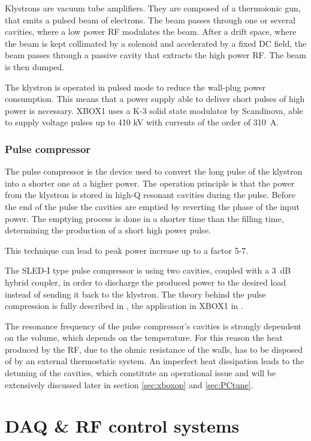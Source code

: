 Klystrons are vacuum tube amplifiers. They are composed of a thermoionic gun, that emits a pulsed beam of electrons. The beam passes through one or several cavities, where a low power RF modulates the beam. After a drift space, where the beam is kept collimated by a solenoid and accelerated by a fixed DC field, the beam passes through a passive cavity that extracts the high power RF. The beam is then dumped. 

The klystron is operated in pulsed mode to reduce the wall-plug power consumption. This means that a power supply able to deliver short pulses of high power is necessary. XBOX1 uses a K-3 solid state modulator by Scandinova, able to supply voltage pulses up to 410 kV with currents of the order of 310~A.


\subsubsection{Pulse compressor}

The pulse compressor is the device used to convert the long pulse of the klystron into a shorter one at a higher power. The operation principle is that the power from the klystron is stored in high-Q resonant cavities during the pulse. Before the end of the pulse the cavities are emptied by reverting the phase of the input power. The emptying process is done in a shorter time than the filling time, determining the production of a short high power pulse. 

This technique can lead to peak power increase up to a factor 5-7. 

The SLED-I type pulse compressor is using two cavities, coupled with a 3~dB hybrid coupler, in order to discharge the produced power to the desired load instead of sending it back to the klystron. The theory behind the pulse compression is fully described in \cite{Fiebig:209756}, the application in XBOX1 in \cite{SLED:ctf3}.

The resonance frequency of the pulse compressor's cavities is strongly dependent on the volume, which depends on the temperature. For this reason the heat produced by the RF, due to the ohmic resistance of the walls, has to be disposed of by an external thermostatic system. An imperfect heat dissipation leads to the detuning of the cavities, which constitute an operational issue and will be extensively discussed later in section \ref{sec:xboxop} and \ref{sec:PCtune}.

 


\section[DAQ \& RF control systems]{DAQ \& RF control systems}
\label{sec:RF_and_DAQ_s}

